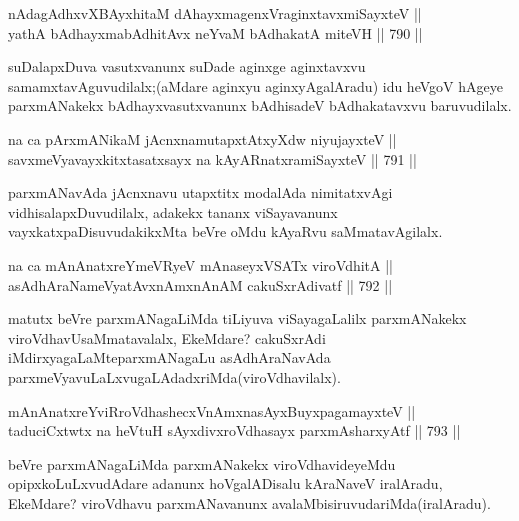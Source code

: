 
\begin{shl}
nAdagAdhxvX\s BAyxhitaM dAhayxmagenxVraginxtavxmiSayxteV || \\
yathA bAdhayxmabAdhitAvx neYvaM bAdhakatA miteVH \hfill || 790 ||  
\end{shl}

\begin{artha}
suDalapxDuva vasutxvanunx suDade aginxge aginxtavxvu samamxtavAguvudilalx;(aMdare aginxyu aginxyAgalAradu) idu heVgoV hAgeye parxmANakekx bAdhayxvasutxvanunx bAdhisadeV bAdhakatavxvu baruvudilalx.
\end{artha}


\begin{shl}
na ca pArxmANikaM jAcnxnamutapxtAtxyXdw niyujayxteV || \\
savxmeVyavayxkitxtasatxsayx na kAyARnatxramiSayxteV \hfill || 791 ||  
\end{shl}

\begin{artha}
parxmANavAda jAcnxnavu utapxtitx modalAda nimitatxvAgi vidhisalapxDuvudilalx, adakekx tananx viSayavanunx vayxkatxpaDisuvudakikxMta beVre oMdu kAyaRvu saMmatavAgilalx.
\end{artha}

\begin{shl}
na ca mAnAnatxreYmeVRyeV mAnaseyxVSATx viroVdhitA || \\
asAdhAraNameVyatAvxnAmxnAnAM cakuSxrAdivatf \hfill || 792 ||  
\end{shl}

\begin{artha}
matutx beVre parxmANagaLiMda tiLiyuva viSayagaLalilx parxmANakekx viroVdhavUsaMmatavalalx, EkeMdare? cakuSxrAdi iMdirxyagaLaMte\break parxmANagaLu asAdhAraNavAda parxmeVyavuLaLxvugaLAdadxriMda\break (viroVdhavilalx).
\end{artha}

\begin{shl}
mAnAnatxreYviRroVdhashecxVnAmxnasAyxBuyxpagamayxteV || \\
taduciCxtwtx na heVtuH sAyxdivxroVdhasayx parxmAsharxyAtf \hfill || 793 ||  
\end{shl}

\begin{artha}
beVre parxmANagaLiMda parxmANakekx viroVdhavideyeMdu opipxkoLuLxvudAdare adanunx hoVgalADisalu kAraNaveV iralAradu, EkeMdare? viroVdhavu parxmANavanunx avalaMbisiruvudariMda\break (iralAradu).
\end{artha}


